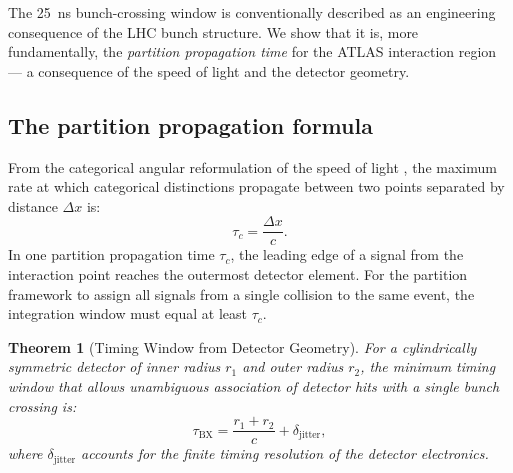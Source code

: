 \documentclass[twocolumn,10pt,a4paper]{article}
\theoremstyle{thmstyle}
\newtheorem{theorem}{Theorem}[section]
\theoremstyle{definition}
\theoremstyle{remark}
\begin{document}
The 25~ns bunch-crossing window is conventionally described as an engineering
consequence of the LHC bunch structure. We show that it is, more
fundamentally, the \emph{partition propagation time} for the ATLAS interaction
region — a consequence of the speed of light and the detector geometry.

\subsection{The partition propagation formula}

From the categorical angular reformulation of the speed of light
\citep{companion:math}, the maximum rate at which categorical distinctions
propagate between two points separated by distance $\Delta x$ is:
\begin{equation}
\tau_c = \frac{\Delta x}{c}.
\label{eq:propagation}
\end{equation}
In one partition propagation time $\tau_c$, the leading edge of a signal from
the interaction point reaches the outermost detector element. For the partition
framework to assign all signals from a single collision to the same event,
the integration window must equal at least $\tau_c$.

\begin{theorem}[Timing Window from Detector Geometry]
\label{thm:timing}
For a cylindrically symmetric detector of inner radius $r_1$ and outer
radius $r_2$, the minimum timing window that allows unambiguous association
of detector hits with a single bunch crossing is:
\begin{equation}
\tau_{\mathrm{BX}} = \frac{r_1 + r_2}{c} + \delta_{\mathrm{jitter}},
\label{eq:tau_BX}
\end{equation}
where $\delta_{\mathrm{jitter}}$ accounts for the finite timing resolution
of the detector electronics.
\end{theorem}
\end{document}
